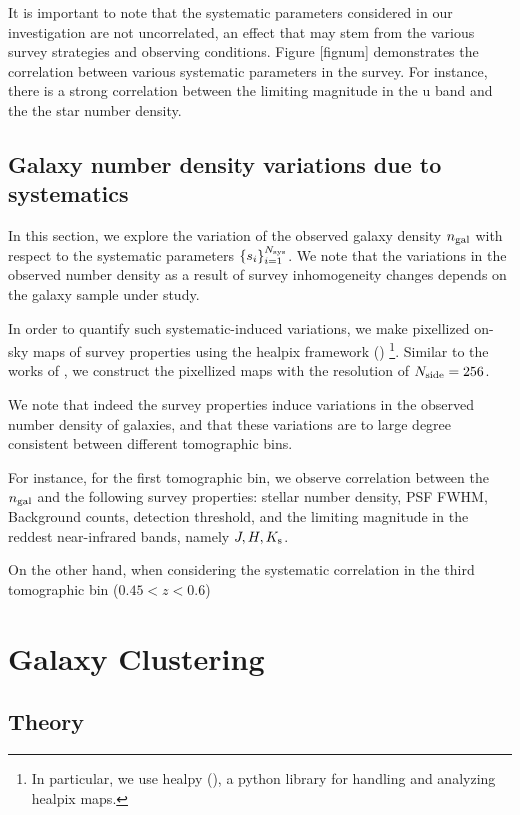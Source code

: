 \documentclass[fleqn,usenatbib,useAMS]{mnras}
\begin{document}
It is important to note that the systematic parameters considered in our investigation are not uncorrelated, an effect that may stem from the various survey strategies and observing conditions. 
Figure [fignum] demonstrates the correlation between various systematic parameters in the survey. 
For instance, there is a strong correlation between the limiting magnitude in the u band and the the star number density. 


\subsection{Galaxy number density variations due to systematics}

In this section, we explore the variation of the observed galaxy density $n_{\rm gal}$ with respect to the systematic parameters $\{s_i\}_{i=1}^{N_{\rm sys}}$. We note that the variations in the observed number density as a result of survey inhomogeneity changes depends on the galaxy sample under study. 

In order to quantify such systematic-induced variations, we make pixellized on-sky maps of survey properties using the healpix framework (\citealt{healpix}) \footnote{In particular, we use healpy (\citealt{healpy2019}), a python library for handling and analyzing healpix maps.}. Similar to the works of \citet{ross2017, rezaie2019}, we construct the pixellized maps with the resolution of $N_{\rm side} = 256$.

We note that indeed the survey properties induce variations in the 
observed number density of galaxies, and that these variations are to large degree consistent between different tomographic bins. 

For instance, for the first tomographic bin, we observe correlation between the $n_{\rm gal}$ and the following survey properties: stellar number density, PSF FWHM, Background counts, detection threshold, and the limiting magnitude in the reddest near-infrared bands, namely $J, H, K_{\rm s}$. 

On the other hand, when considering the systematic correlation in the third tomographic bin ($0.45<z<0.6$)

\section{Galaxy Clustering}\label{sec:clustering}
\subsection{Theory}
\end{document}
